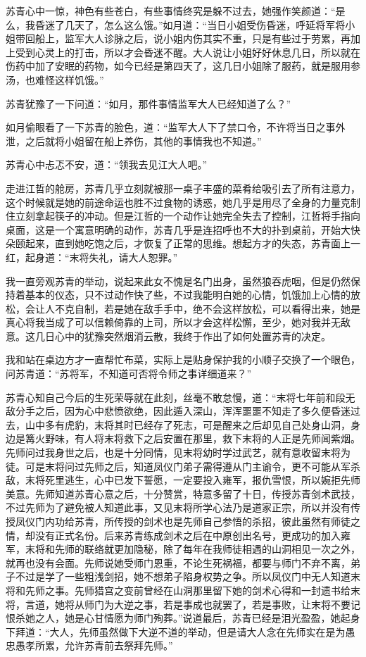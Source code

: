 苏青心中一惊，神色有些苍白，有些事情终究是躲不过去，她强作笑颜道：“是么，我昏迷了几天了，怎么这么饿。”如月道：“当日小姐受伤昏迷，呼延将军将小姐带回船上，监军大人诊脉之后，说小姐内伤其实不重，只是有些过于劳累，再加上受到心灵上的打击，所以才会昏迷不醒。大人说让小姐好好休息几日，所以就在伤药中加了安眠的药物，如今已经是第四天了，这几日小姐除了服药，就是服用参汤，也难怪这样饥饿。”

苏青犹豫了一下问道：“如月，那件事情监军大人已经知道了么？”

如月偷眼看了一下苏青的脸色，道：“监军大人下了禁口令，不许将当日之事外泄，之后就将小姐留在船上养伤，其他的事情我也不知道。”

苏青心中忐忑不安，道：“领我去见江大人吧。”

走进江哲的舱房，苏青几乎立刻就被那一桌子丰盛的菜肴给吸引去了所有注意力，这个时候就是她的前途命运也胜不过食物的诱惑，她几乎是用尽了全身的力量克制住立刻拿起筷子的冲动。但是江哲的一个动作让她完全失去了控制，江哲将手指向桌面，这是一个寓意明确的动作，苏青几乎是连招呼也不大的扑到桌前，开始大快朵颐起来，直到她吃饱之后，才恢复了正常的思维。想起方才的失态，苏青面上一红，起身道：“末将失礼，请大人恕罪。”

我一直旁观苏青的举动，说起来此女不愧是名门出身，虽然狼吞虎咽，但是仍然保持着基本的仪态，只不过动作快了些，不过我能明白她的心情，饥饿加上心情的放松，会让人不克自制，若是她在敌手手中，绝不会这样放松，可以看得出来，她是真心将我当成了可以信赖倚靠的上司，所以才会这样松懈，至少，她对我并无敌意。这几日心中的犹豫突然烟消云散，我终于作出了如何处置苏青的决定。

我和站在桌边方才一直帮忙布菜，实际上是贴身保护我的小顺子交换了一个眼色，问苏青道：“苏将军，不知道可否将令师之事详细道来？”

苏青心知自己今后的生死荣辱就在此刻，丝毫不敢怠慢，道：“末将七年前和段无敌分手之后，因为心中悲愤欲绝，因此遁入深山，浑浑噩噩不知走了多久便昏迷过去，山中多有虎豹，末将其时已经存了死志，可是醒来之后却见自己处身山洞，身边是篝火野味，有人将末将救下之后安置在那里，救下末将的人正是先师闻紫烟。先师问过我身世之后，也是十分同情，见末将幼时学过武艺，就有意收留末将为徒。可是末将问过先师之后，知道凤仪门弟子需得遵从门主谕令，更不可能从军杀敌，末将死里逃生，心中已发下誓愿，一定要投入雍军，报仇雪恨，所以婉拒先师美意。先师知道苏青心意之后，十分赞赏，特意多留了十日，传授苏青剑术武技，不过先师为了避免被人知道此事，又见末将所学心法乃是道家正宗，所以并没有传授凤仪门内功给苏青，所传授的剑术也是先师自己参悟的杀招，彼此虽然有师徒之情，却没有正式名份。后来苏青练成剑术之后在中原创出名号，更成功的加入雍军，末将和先师的联络就更加隐秘，除了每年在我师徒相遇的山洞相见一次之外，就再也没有会面。先师说她受师门恩重，不论生死祸福，都要与师门不弃不离，弟子不过是学了一些粗浅剑招，她不想弟子陷身权势之争。所以凤仪门中无人知道末将和先师之事。先师猎宫之变前曾经在山洞那里留下她的剑术心得和一封遗书给末将，言道，她将从师门为大逆之事，若是事成也就罢了，若是事败，让末将不要记恨杀她之人，她是心甘情愿为师门殉葬。”说道最后，苏青已经是泪光盈盈，她起身下拜道：“大人，先师虽然做下大逆不道的举动，但是请大人念在先师实在是为愚忠愚孝所累，允许苏青前去祭拜先师。”

